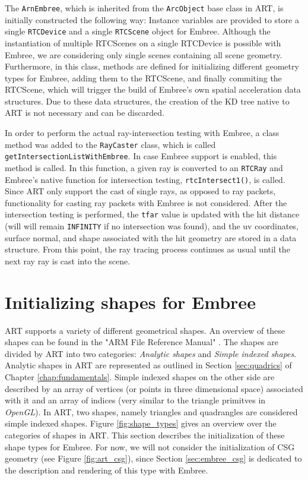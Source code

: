 The \texttt{ArnEmbree}, which is inherited from the \texttt{ArcObject} base class in ART, is initially constructed the following way: Instance variables are provided to store a single \texttt{RTCDevice} and a single \texttt{RTCScene} object for Embree. Although the instantiation of multiple RTCScenes on a single RTCDevice is possible with Embree, we are considering only single scenes containing all scene geometry. Furthermore, in this class, methods are defined for initializing different geometry types for Embree, adding them to the RTCScene, and finally commiting the RTCScene, which will trigger the build of Embree's own spatial acceleration data structures. Due to these data structures, the creation of the KD tree native to ART is not necessary and can be discarded.

In order to perform the actual ray-intersection testing with Embree, a class method was added to the \texttt{RayCaster} class, which is called \texttt{getIntersectionListWithEmbree}. In case Embree support is enabled, this method is called. In this function, a given ray is converted to an \texttt{RTCRay} and Embree's native function for intersection testing, \texttt{rtcIntersect1()}, is called. Since ART only support the cast of single rays, as opposed to ray packets, functionality for casting ray packets with Embree is not considered. After the intersection testing is performed, the  \texttt{tfar} value is updated with the hit distance (will will remain \texttt{INFINITY} if no intersection was found), and the uv coordinates, surface normal, and shape associated with the hit geometry are stored in a  data structure. From this point, the ray tracing process continues as usual until the next ray ray is cast into the scene.

\section{Initializing shapes for Embree}

ART supports a variety of different geometrical shapes. An overview of these shapes can be found in the "ARM File Reference Manual" \cite{artreferencemanual}. The shapes are divided by ART into two categories: \emph{Analytic shapes} and \emph{Simple indexed shapes}. Analytic shapes in ART are represented as outlined in Section \ref{sec:quadrics} of Chapter \ref{chap:fundamentals}. Simple indexed shapes on the other side are described by an array of vertices (or points in three dimensional space) associated with it and an array of indices (very similar to the triangle primitves in \emph{OpenGL}). In ART, two shapes, namely triangles and quadrangles are considered simple indexed shapes. Figure \ref{fig:shape_types} gives an overview over the categories of shapes in ART. This section describes the initialization of these shape types for Embree. For now, we will not consider the initialization of CSG geometry (see Figure \ref{fig:art_csg}), since Section \ref{sec:embree_csg} is dedicated to the description and rendering of this type with Embree.

